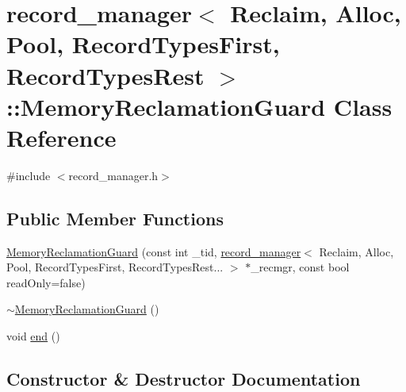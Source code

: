 \hypertarget{classrecord__manager_1_1MemoryReclamationGuard}{}\section{record\+\_\+manager$<$ Reclaim, Alloc, Pool, Record\+Types\+First, Record\+Types\+Rest $>$\+:\+:Memory\+Reclamation\+Guard Class Reference}
\label{classrecord__manager_1_1MemoryReclamationGuard}


{\ttfamily \#include $<$record\+\_\+manager.\+h$>$}

\subsection*{Public Member Functions}
\begin{DoxyCompactItemize}
\item 
\hyperlink{classrecord__manager_1_1MemoryReclamationGuard_a36dcf7f0c984d1cd92382e1f1b4e299c}{Memory\+Reclamation\+Guard} (const int \+\_\+tid, \hyperlink{classrecord__manager}{record\+\_\+manager}$<$ Reclaim, Alloc, Pool, Record\+Types\+First, Record\+Types\+Rest... $>$ $\ast$\+\_\+recmgr, const bool read\+Only=false)
\item 
\hyperlink{classrecord__manager_1_1MemoryReclamationGuard_acbedb9b1c0aa0c9c0527964911adb6dc}{$\sim$\+Memory\+Reclamation\+Guard} ()
\item 
void \hyperlink{classrecord__manager_1_1MemoryReclamationGuard_ac3f1295823181aff94971f7b214c78ea}{end} ()
\end{DoxyCompactItemize}


\subsection{Constructor \& Destructor Documentation}
\mbox{\label{classrecord__manager_1_1MemoryReclamationGuard_a36dcf7f0c984d1cd92382e1f1b4e299c}} 
